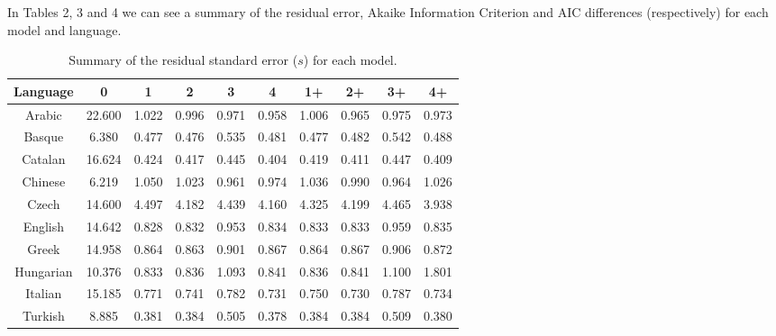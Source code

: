 \documentclass{article}
\begin{document}
In Tables 2, 3 and 4 we can see a summary of the residual error, Akaike Information Criterion and AIC differences (respectively) for each model and language.

\begin{table}[H]
\centering
\begin{tabular}{cccccccccc}
    Language & 0 & 1 & 2 & 3 & 4 & 1+ & 2+ & 3+ & 4+ \\
    \hline
    Arabic      & 22.600     & 1.022     & 0.996     & 0.971     & 0.958     & 1.006     & 0.965     & 0.975     & 0.973 \\
    Basque      & 6.380      & 0.477     & 0.476     & 0.535     & 0.481     & 0.477     & 0.482     & 0.542     & 0.488 \\
    Catalan     & 16.624     & 0.424     & 0.417     & 0.445     & 0.404     & 0.419     & 0.411     & 0.447     & 0.409 \\
    Chinese     & 6.219      & 1.050     & 1.023     & 0.961     & 0.974     & 1.036     & 0.990     & 0.964     & 1.026 \\
    Czech       & 14.600     & 4.497     & 4.182     & 4.439     & 4.160     & 4.325     & 4.199     & 4.465     & 3.938 \\
    English     & 14.642     & 0.828     & 0.832     & 0.953     & 0.834     & 0.833     & 0.833     & 0.959     & 0.835 \\
    Greek       & 14.958     & 0.864     & 0.863     & 0.901     & 0.867     & 0.864     & 0.867     & 0.906     & 0.872 \\
    Hungarian   & 10.376     & 0.833     & 0.836     & 1.093     & 0.841     & 0.836     & 0.841     & 1.100     & 1.801 \\
    Italian     & 15.185     & 0.771     & 0.741     & 0.782     & 0.731     & 0.750     & 0.730     & 0.787     & 0.734 \\
    Turkish     & 8.885      & 0.381     & 0.384     & 0.505     & 0.378     & 0.384     & 0.384     & 0.509     & 0.380  \\
    \hline
\end{tabular}
\label{Table:T2}
\caption{Summary of the residual standard error ($s$) for each model.}
\end{table}
\end{document}
